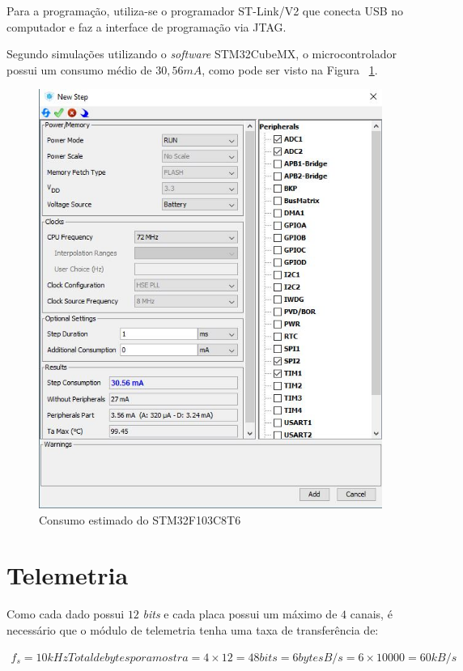 \documentclass[
	12pt,				%
	openright,			%
	twoside,			%
	a4paper,			%
	english,			%
	french,				%
	spanish,			%
	brazil,				%
	]{abntex2}
\begin{document}
		Para a programação, utiliza-se o programador ST-Link/V2 que
		conecta USB no computador e faz a interface de programação via
		JTAG.

		Segundo simulações utilizando o \textit{software} STM32CubeMX, o
		microcontrolador possui um consumo médio de $30,56mA$, como pode ser
		visto na Figura ~\ref{fig:consumoSTM}.

		\begin{figure}[!ht]
			\centering
			\includegraphics[scale = 0.6]{../Fotos/stmConsumo.jpg}
			\caption{Consumo estimado do STM32F103C8T6}
			\label{fig:consumoSTM}
		\end{figure}

	\section{Telemetria}
		Como cada dado possui $12$ \textit{bits} e cada placa possui um
		máximo de $4$ canais, é necessário que o módulo de telemetria
		tenha uma taxa de transferência de:

		\begin{gather*}
			f_s = 10kHz
			Total de bytes por amostra = 4\times 12 = 48 bits = 6 bytes
			B/s = 6\times 10000 = 60kB/s
		\end{gather*}
\end{document}
